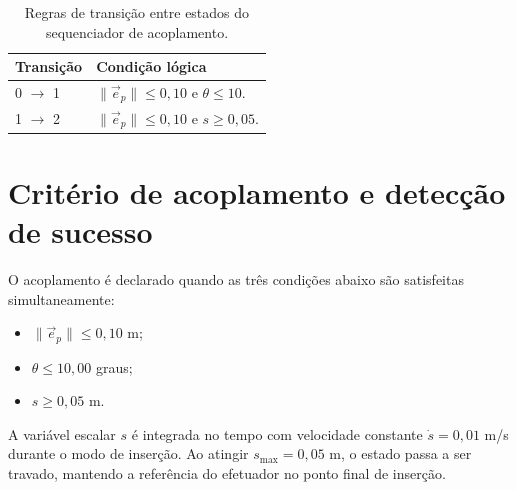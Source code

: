 \begin{table}[H]
\centering
\caption{Regras de transição entre estados do sequenciador de acoplamento.}
\label{ttab_apD_regras_transicao}
\small
\begin{tabular}{ll}
\toprule
\textbf{Transição} & \textbf{Condição lógica} \\
\midrule
0 $\rightarrow$ 1 &
$\|\vec{e}_p\| \leq 0,10$ \; e \; $\theta \leq 10$. \\
1 $\rightarrow$ 2 &
$\|\vec{e}_p\| \leq 0,10$ \; e \; $s \geq 0,05$. \\
\end{tabular}
\end{table}



\section{Critério de acoplamento e detecção de sucesso}
\label{ap_apendiceE_acoplamento}

O acoplamento é declarado quando as três condições abaixo são satisfeitas simultaneamente:

\begin{itemize}
    \item $\|\vec{e}_p\| \leq 0{,}10$ m;
    \item $\theta \leq 10{,}00$ graus;
    \item $s \geq 0{,}05$ m.
\end{itemize}

A variável escalar $s$ é integrada no tempo com velocidade constante $\dot{s}=0{,}01$ m/s durante o modo de inserção.
Ao atingir $s_{\max}=0{,}05$ m, o estado passa a ser travado, mantendo a referência do efetuador no ponto final de inserção.




